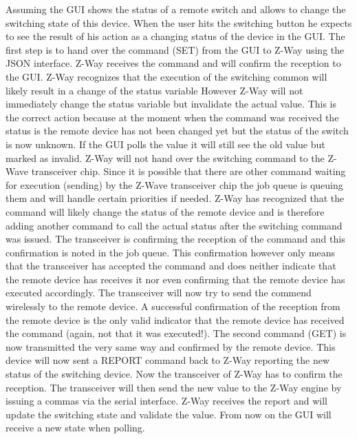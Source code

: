 Assuming the GUI shows the status of a remote switch and allows to change the switching state of this device. When the user hits the switching button he expects to 
see the result of his action as a changing status of the device in the GUI. The first step is to hand over the command (SET)  from the GUI to Z-Way using the JSON interface.
Z-Way receives the command and will confirm the reception to the GUI. Z-Way recognizes that the execution of the switching common will likely result in a change 
of the status variable However Z-Way will not immediately change the status variable but invalidate the actual value. This is the correct action because at the moment
when the command was received the status is the remote device has not been changed yet but the status of the switch is now unknown.
If the GUI polls the value it will still see the old value but marked as invalid.
Z-Way will not hand over the switching command to the Z-Wave transceiver chip. Since it is possible that there are other command waiting for execution (sending) by 
the Z-Wave transceiver chip the job queue is queuing them and will handle certain priorities if needed. Z-Way has recognized that the command will likely change the status
of the remote device and is therefore adding another command to call the actual status after the switching command was issued.
The transceiver is confirming the reception of the command and this confirmation is noted in the job queue. This confirmation however only means that the transceiver 
has accepted the command and does neither indicate that the remote device has receives it nor even confirming that the remote device has executed accordingly.
The transceiver will now try to send the commend wirelessly to the remote device. A successful confirmation of the reception from the remote device is the only valid 
indicator that the remote device has received the command (again, not that it was executed!).
The second command (GET) is now transmitted the very same way and confirmed by the remote device. This device will now sent a REPORT command back to Z-Way
reporting the new status of the switching device. Now the transceiver of Z-Way has to confirm the reception. The transceiver will then send the new value to the Z-Way 
engine by issuing a commas via the serial interface. Z-Way receives the report and will update the switching state and validate the value.
From now on the GUI will receive a new state when polling.
